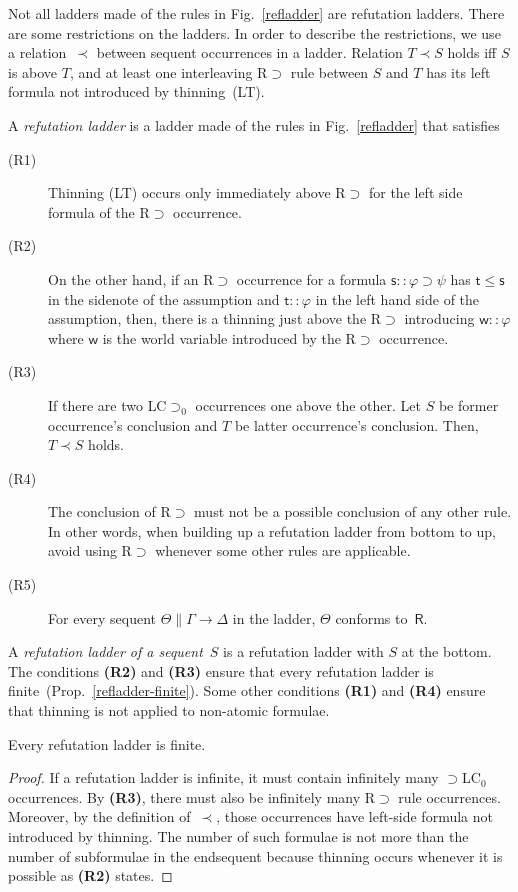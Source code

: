   Not all ladders made of the rules in Fig.~\ref{refladder} are
  refutation ladders.
  There are some restrictions on the ladders.
  In order to describe the restrictions,
  we use a relation~$\prec$ between sequent occurrences in a ladder.
  Relation $T\prec S$ holds iff
  $S$ is above $T$, and
  at least one interleaving \textrm{R$\supset$} rule between $S$ and $T$
  has its left formula not introduced by thinning~(LT).
  \begin{definition}
   A \textit{refutation ladder} is a ladder made of the rules in
   Fig.~\ref{refladder} that satisfies
   \begin{description}
    \item[ (R1)] Thinning \textrm{(LT)} occurs only immediately above \textrm{R$\supset$} for the
	 left side formula of the \textrm{R$\supset$} occurrence.
    \item[ (R2)]
	 On the other hand, if an \textrm{R$\supset$} occurrence
	 for a formula
	 $\mathsf s::\varphi\supset\psi$ has $\mathsf t\le \mathsf s$
	 in the sidenote of the assumption and
	 $\mathsf t::\varphi$ in the left hand side of the assumption,
	 then,
	 there is a thinning just above the R$\supset$ introducing
	 $\mathsf w::\varphi$ where $\mathsf w$ is the world variable
	 introduced by the \textrm{R$\supset$} occurrence.
    \item[ (R3)]
	 If there are two \textrm{LC$\supset_0$} occurrences one above the
	 other.
	 Let $S$ be former occurrence's conclusion and $T$ be latter occurrence's
	 conclusion.
	 Then, $T\prec S$ holds.
    \item[ (R4)]
	 The conclusion of \textrm{R$\supset$} must not be a
	 possible conclusion of any other rule.
	 In other words, when building up a refutation ladder from
	 bottom to up, avoid using R$\supset$ whenever some other
	 rules are applicable.
    \item[ (R5)]
	 For every sequent $\Theta\parallel \Gamma\rightarrow\Delta$
	 in the ladder, $\Theta$ conforms to~$\mathsf R$.
   \end{description}
  \end{definition}
  A \textit{refutation ladder of a sequent}~$S$ is a refutation ladder
  with
  $S$ at the bottom.
  The conditions \textbf{(R2)} and \textbf{(R3)} ensure that every
  refutation ladder is finite~(Prop.~\ref{refladder-finite}).
  Some other conditions \textbf{(R1)} and \textbf{(R4)} ensure
  that thinning is not applied to non-atomic formulae.


  \begin{proposition}
   \label{refladder-finite}
   Every refutation ladder is finite.
  \end{proposition}
  \begin{proof}
   If a refutation ladder is infinite,
   it must contain infinitely many $\supset$LC$_0$ occurrences.
   By \textbf{(R3)}, there must also be infinitely many R$\supset$ rule
   occurrences.
   Moreover, by the definition of~$\prec$,
   those occurrences have left-side formula not
   introduced by thinning.
   The number of such formulae is not more than the number of subformulae
   in the endsequent because thinning occurs whenever it is possible as
   \textbf{(R2)} states.
  \end{proof}


